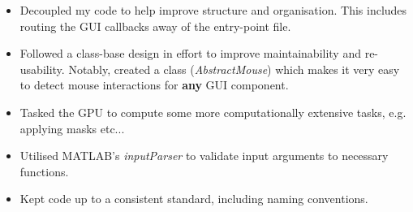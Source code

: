 \documentclass{coursework}
\begin{document}
			\begin{itemize}
				\item Decoupled my code to help improve structure and organisation. This includes routing the GUI callbacks away of the entry-point file.
				\item Followed a class-base design in effort to improve maintainability and re-usability. Notably, created a class (\textit{AbstractMouse}) which makes it very easy to detect mouse interactions for \textbf{any} GUI component.
				\item Tasked the GPU to compute some more computationally extensive tasks, e.g. applying masks etc...
				\item Utilised MATLAB's \textit{inputParser} \parencite{matlabInputParser} to validate input arguments to necessary functions.
				\item Kept code up to a consistent standard, including naming conventions.
			\end{itemize}

	\printbibliography
	
\end{document}
